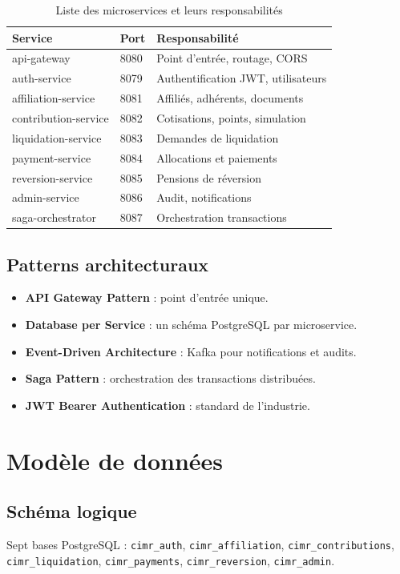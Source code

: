 \documentclass[12pt,a4paper,oneside]{report}
\begin{document}
\begin{table}[H]
\centering
\caption{Liste des microservices et leurs responsabilités}
\begin{tabular}{lll}
\toprule
\textbf{Service} & \textbf{Port} & \textbf{Responsabilité} \\
\midrule
api-gateway & 8080 & Point d'entrée, routage, CORS \\
auth-service & 8079 & Authentification JWT, utilisateurs \\
affiliation-service & 8081 & Affiliés, adhérents, documents \\
contribution-service & 8082 & Cotisations, points, simulation \\
liquidation-service & 8083 & Demandes de liquidation \\
payment-service & 8084 & Allocations et paiements \\
reversion-service & 8085 & Pensions de réversion \\
admin-service & 8086 & Audit, notifications \\
saga-orchestrator & 8087 & Orchestration transactions \\
\bottomrule
\end{tabular}
\end{table}

\subsection{Patterns architecturaux}
\begin{itemize}
    \item \textbf{API Gateway Pattern} : point d'entrée unique.
    \item \textbf{Database per Service} : un schéma PostgreSQL par microservice.
    \item \textbf{Event-Driven Architecture} : Kafka pour notifications et audits.
    \item \textbf{Saga Pattern} : orchestration des transactions distribuées.
    \item \textbf{JWT Bearer Authentication} : standard de l'industrie.
\end{itemize}

\section{Modèle de données}

\subsection{Schéma logique}
Sept bases PostgreSQL : \texttt{cimr\_auth}, \texttt{cimr\_affiliation}, \texttt{cimr\_contributions}, \texttt{cimr\_liquidation}, \texttt{cimr\_payments}, \texttt{cimr\_reversion}, \texttt{cimr\_admin}.
\end{document}
